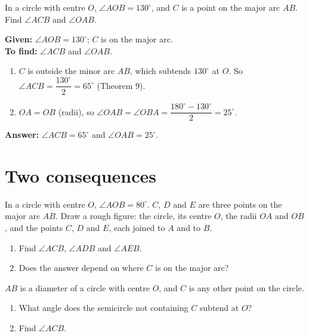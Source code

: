 \begin{example}
In a circle with centre $O$, $\angle AOB=130^\circ$, and $C$ is a point on the major arc $AB$. Find $\angle ACB$ and $\angle OAB$.
\end{example}


\textbf{Given:} $\angle AOB=130^\circ$; $C$ is on the major arc.\\
\textbf{To find:} $\angle ACB$ and $\angle OAB$.
\begin{enumerate}[leftmargin=1.8em,itemsep=1pt]
  \item $C$ is outside the minor arc $AB$, which subtends $130^\circ$ at $O$. So $\angle ACB=\dfrac{130^\circ}{2}=65^\circ$ (Theorem 9).
  \item $OA=OB$ (radii), so $\angle OAB=\angle OBA=\dfrac{180^\circ-130^\circ}{2}=25^\circ$.
\end{enumerate}
\textbf{Answer:} $\angle ACB=65^\circ$ and $\angle OAB=25^\circ$.

\section{Two consequences}

\begin{solvefirst}
  \item In a circle with centre $O$, $\angle AOB=80^\circ$. $C$, $D$ and $E$ are three points on the major arc $AB$. Draw a rough figure: the circle, its centre $O$, the radii $OA$ and $OB$, and the points $C$, $D$ and $E$, each joined to $A$ and to $B$.
  \begin{enumerate}[label=(\alph*),itemsep=1pt]
    \item Find $\angle ACB$, $\angle ADB$ and $\angle AEB$.
    \item Does the answer depend on where $C$ is on the major arc?
  \end{enumerate}
  \item $AB$ is a diameter of a circle with centre $O$, and $C$ is any other point on the circle.
  \begin{enumerate}[label=(\alph*),itemsep=1pt]
    \item What angle does the semicircle not containing $C$ subtend at $O$?
    \item Find $\angle ACB$.
  \end{enumerate}
\end{solvefirst}

